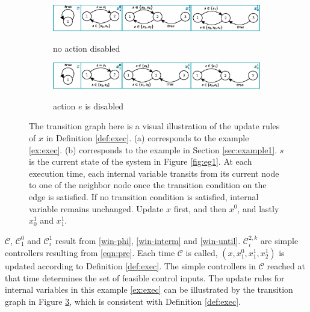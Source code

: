 \begin{example}
	\begin{figure}
		\centering
		\begin{subfigure}[b]{1\textwidth}
				\centering
				\includegraphics[width=0.85\linewidth]{pic/xupdate}
				\label{fig:xupdate1}
				\caption{no action disabled}
		\end{subfigure}
		\begin{subfigure}[b]{1\textwidth}
			\centering
			\includegraphics[width=0.85\linewidth]{pic/xupdate2}
			\label{fig:xupdate2}
			\caption{ action $ e $ is disabled}
		\end{subfigure}
		\caption{ The transition graph here is a visual illustration of the update rules of $ x $ in Definition \ref{def:exec}. (a) corresponds to the example \ref{ex:exec}. (b) corresponds to the example in Section \ref{sec:example1}. $s $ is the current state of the system in Figure \ref{fig:eg1}. At each execution time, each internal variable transits from its current node to one of the neighbor node once the transition condition on the edge is satisfied. If no transition condition is satisfied, internal variable remains unchanged. Update $ x$ first, and then $ x^0 $, and lastly $ x_0^1 $ and $x^1_1 $.} 
		\label{fig:xupdate}
	\end{figure}
	
	$ \mathcal{C} $, $ \mathcal{C}_1^0 $ and $ \mathcal{C}_i^1 $ result from \eqref{win-phi}, \eqref{win-interm} and \eqref{win-until}. $ \mathcal{C}_i^{2,k} $ are simple controllers resulting from \eqref{eqn:pre}. Each time $ \mathcal{C} $ is called, $ (x,x^0_1,x^1_1,x^1_2) $ is updated according to Definition \ref{def:exec}. The simple controllers in $ \mathcal{C} $ reached at that time determines the set of feasible control inputs. The update rules for internal variables in this example \ref{ex:exec} can be illustrated by the transition graph in Figure \ref{fig:xupdate}, which is consistent with Definition \ref{def:exec}. %
	

\end{example}
